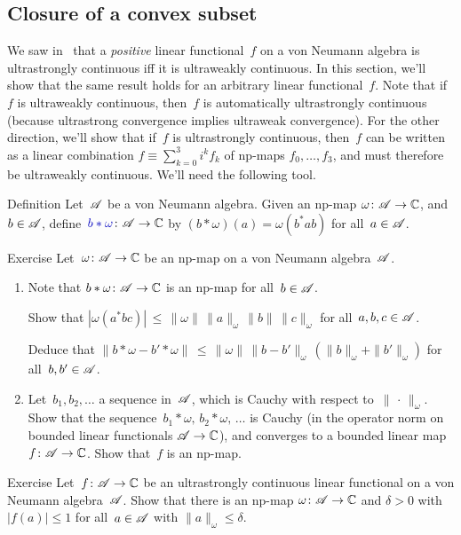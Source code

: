 \documentclass[a]{subfiles}
\begin{document}
\subsection{Closure of a convex subset}
\begin{parsec}%
\begin{point}%
We saw in~
that a \emph{positive} linear functional~$f$
on a von Neumann algebra 
is ultrastrongly continuous iff it is ultraweakly continuous.
In this section, we'll show that the same result holds
for an arbitrary linear functional~$f$.
Note that if~$f$ is ultraweakly continuous,
then~$f$ is automatically ultrastrongly continuous
(because ultrastrong convergence implies ultraweak convergence).
For the other direction,
we'll show that if~$f$ is ultrastrongly continuous,
then~$f$ can be written as a linear combination
$f\equiv \sum_{k=0}^3 i^k f_k$
of np-maps $f_0,\dotsc,f_3$,
and must therefore be ultraweakly continuous.
We'll need the following tool.
\end{point}
\begin{point}[bstaromega]{Definition}%
Let~$\mathscr{A}$ be a von Neumann algebra.
Given an np-map $\omega\colon \mathscr{A}\to\mathbb{C}$,
and~$b\in \mathscr{A}$,
define~$\Define{b*\omega}\colon \scrA\to \C$ by
$(b*\omega)(a)=\omega(b^*ab)$ for all~$a\in \mathscr{A}$.
\end{point}
\begin{point}{Exercise}%
Let~$\omega\colon \mathscr{A}\to \mathbb{C}$ be an np-map on a von Neumann algebra~$\mathscr{A}$.
\begin{enumerate}
\item
Note that $b*\omega\colon \mathscr{A}\to\mathbb{C}$
is an np-map for all~$b\in \mathscr{A}$.

Show that $\left|\omega(a^*bc)\right| 
\,\leq\, \|\omega\|\,\|a\|_\omega\, \|b\|\, \|c\|_\omega$
for all~$a,b,c\in\mathscr{A}$.

Deduce that $\| b*\omega - b'*\omega\|
\,\leq\, \|\omega\| \,\|b-b'\|_\omega\, (\|b\|_\omega + \|b'\|_\omega)$
for all~$b,b'\in\mathscr{A}$.

\item
Let~$b_1,b_2,\dotsc$  a sequence in~$\mathscr{A}$,
which is Cauchy with respect to~$\|\,\cdot\,\|_\omega$.
Show that the sequence~$b_1*\omega,\,b_2*\omega,\,\dotsc$ 
is Cauchy (in the operator norm
on bounded linear functionals $\mathscr{A}\to\mathbb{C}$),
and converges to a bounded linear map~$f\colon \mathscr{A}\to\mathbb{C}$.
Show that~$f$ is an np-map.
\end{enumerate}
\end{point}
\begin{point}{Exercise}%
Let~$f\colon \mathscr{A}\to \mathbb{C}$ be an ultrastrongly continuous linear
functional on a von Neumann algebra~$\mathscr{A}$.
Show that there is an np-map
$\omega\colon \mathscr{A}\to \mathbb{C}$
and $\delta>0$
with $\left|f(a)\right|\leq 1$
for all~$a\in\mathscr{A}$ with $\|a\|_\omega \leq \delta$.


\end{point}
\end{parsec}
\end{document}
